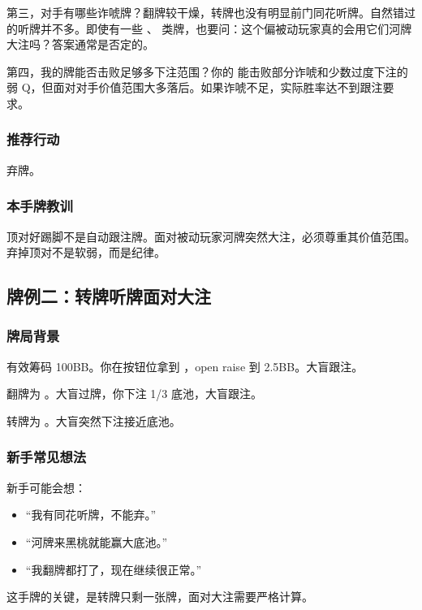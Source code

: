 第三，对手有哪些诈唬牌？翻牌较干燥，转牌也没有明显前门同花听牌。自然错过的听牌并不多。即使有一些 、 类牌，也要问：这个偏被动玩家真的会用它们河牌大注吗？答案通常是否定的。

第四，我的牌能否击败足够多下注范围？你的  能击败部分诈唬和少数过度下注的弱 Q，但面对对手价值范围大多落后。如果诈唬不足，实际胜率达不到跟注要求。

\subsubsection*{推荐行动}

弃牌。

\subsubsection*{本手牌教训}

顶对好踢脚不是自动跟注牌。面对被动玩家河牌突然大注，必须尊重其价值范围。弃掉顶对不是软弱，而是纪律。

\subsection{牌例二：转牌听牌面对大注}

\subsubsection*{牌局背景}

有效筹码 100BB。你在按钮位拿到 ，open raise 到 2.5BB。大盲跟注。

翻牌为 。大盲过牌，你下注 1/3 底池，大盲跟注。

转牌为 。大盲突然下注接近底池。

\subsubsection*{新手常见想法}

新手可能会想：

\begin{itemize}
\item “我有同花听牌，不能弃。”
\item “河牌来黑桃就能赢大底池。”
\item “我翻牌都打了，现在继续很正常。”
\end{itemize}

这手牌的关键，是转牌只剩一张牌，面对大注需要严格计算。

